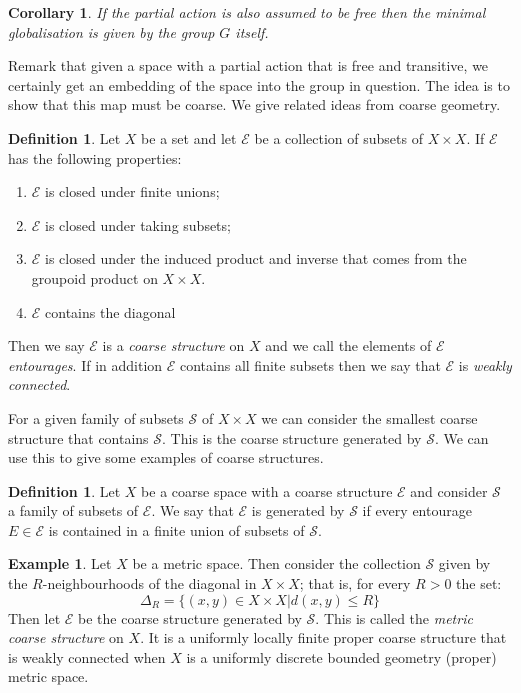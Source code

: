 \documentclass[11pt,a4paper]{amsart}
\theoremstyle{plain}
\newtheorem{corollary}[theorem]{Corollary}%
\theoremstyle{definition}%
\newtheorem{definition}[theorem]{Definition}%
\newtheorem{example}[theorem]{Example}%
\theoremstyle{remark}%
\begin{document}
\begin{corollary}\label{Cor:FreeTrans}
If the partial action is also assumed to be free then the minimal globalisation is given by the group $G$ itself.
\end{corollary}

Remark that given a space with a partial action that is free and transitive, we certainly get an embedding of the space into the group in question. The idea is to show that this map must be coarse. We give related ideas from coarse geometry.

\begin{definition}
Let $X$ be a set and let $\mathcal{E}$ be a collection of subsets of $X \times X$. If $\mathcal{E}$ has the following properties:
\begin{enumerate}
\item $\mathcal{E}$ is closed under finite unions;
\item $\mathcal{E}$ is closed under taking subsets;
\item $\mathcal{E}$ is closed under the induced product and inverse that comes from the groupoid product on $X \times X$.
\item $\mathcal{E}$ contains the diagonal
\end{enumerate}
Then we say $\mathcal{E}$ is a \textit{coarse structure} on $X$ and we call the elements of $\mathcal{E}$ \textit{entourages}. If in addition $\mathcal{E}$ contains all finite subsets then we say that $\mathcal{E}$ is \textit{weakly connected}.
\end{definition}

For a given family of subsets $\mathcal{S}$ of $X \times X$ we can consider the smallest coarse structure that contains $\mathcal{S}$. This is the coarse structure generated by $\mathcal{S}$. We can use this to give some examples of coarse structures.

\begin{definition}
Let $X$ be a coarse space with a coarse structure $\mathcal{E}$ and consider $\mathcal{S}$ a family of subsets of $\mathcal{E}$. We say that $\mathcal{E}$ is generated by $\mathcal{S}$ if every entourage $E \in \mathcal{E}$ is contained in a finite union of subsets of $\mathcal{S}$.
\end{definition}

\begin{example}\label{ex:MCS}
Let $X$ be a metric space. Then consider the collection $\mathcal{S}$ given by the $R$-neighbourhoods of the diagonal in $X\times X$; that is, for every $R>0$ the set:
\begin{equation*}
\Delta_{R}=\lbrace (x,y) \in X \times X | d(x,y)\leq R \rbrace
\end{equation*}
Then let $\mathcal{E}$ be the coarse structure generated by $\mathcal{S}$. This is called the \textit{metric coarse structure} on $X$. It is a uniformly locally finite proper coarse structure that is weakly connected when $X$ is a uniformly discrete bounded geometry (proper) metric space.
\end{example}
\end{document}
